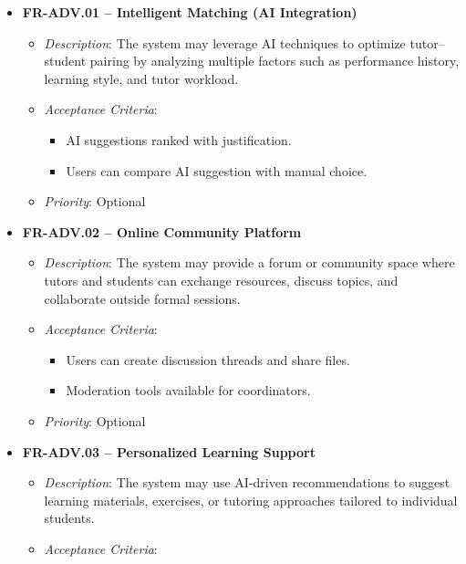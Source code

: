 \begin{itemize}
    \item \textbf{FR-ADV.01 – Intelligent Matching (AI Integration)}
        \begin{itemize}
            \item \textit{Description}: The system may leverage AI techniques to optimize tutor–student pairing by analyzing multiple factors such as performance history, learning style, and tutor workload.
            \item \textit{Acceptance Criteria}:
                \begin{itemize}
                    \item AI suggestions ranked with justification.
                    \item Users can compare AI suggestion with manual choice.
                \end{itemize} 
            \item \textit{Priority}: Optional
        \end{itemize}
    \item \textbf{FR-ADV.02 – Online Community Platform}
        \begin{itemize}
            \item \textit{Description}: The system may provide a forum or community space where tutors and students can exchange resources, discuss topics, and collaborate outside formal sessions.
            \item \textit{Acceptance Criteria}:
                \begin{itemize}
                    \item Users can create discussion threads and share files.
                    \item Moderation tools available for coordinators.
                \end{itemize} 
            \item \textit{Priority}: Optional
        \end{itemize}
    \item \textbf{FR-ADV.03 – Personalized Learning Support}
        \begin{itemize}
            \item \textit{Description}: The system may use AI-driven recommendations to suggest learning materials, exercises, or tutoring approaches tailored to individual students.
            \item \textit{Acceptance Criteria}:
                \begin{itemize}

\end{itemize}
\end{itemize}
\end{itemize}
